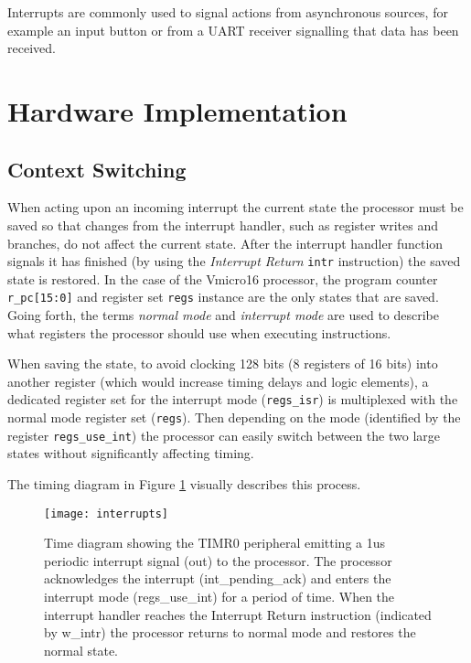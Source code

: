 Interrupts are commonly used to signal actions from asynchronous sources, for example an input button or from a UART receiver signalling that data has been received.

\section{Hardware Implementation}

\subsection{Context Switching}
When acting upon an incoming interrupt the current state the processor must be saved so that changes from the interrupt handler, such as register writes and branches, do not affect the current state. After the interrupt handler function signals it has finished (by using the \textit{Interrupt Return} \verb|intr| instruction) the saved state is restored.
In the case of the Vmicro16 processor, the program counter \verb|r_pc[15:0]| and register set \verb|regs| instance are the only states that are saved. Going forth, the terms \textit{normal mode} and \textit{interrupt mode} are used to describe what registers the processor should use when executing instructions.

When saving the state, to avoid clocking 128 bits (8 registers of 16 bits) into another register (which would increase timing delays and logic elements), a dedicated register set for the interrupt mode (\verb|regs_isr|) is multiplexed with the normal mode register set (\verb|regs|). Then depending on the mode (identified by the register \verb|regs_use_int|) the processor can easily switch between the two large states without significantly affecting timing.

The timing diagram in Figure \ref{fig:interrupts} visually describes this process.

\begin{figure}[h]
\centering
\texttt{[image: interrupts]}
\caption{Time diagram showing the TIMR0 peripheral emitting a 1us periodic interrupt signal (out) to the processor. The processor acknowledges the interrupt (int\_pending\_ack) and enters the interrupt mode (regs\_use\_int) for a period of time. When the interrupt handler reaches the Interrupt Return instruction (indicated by w\_intr) the processor returns to normal mode and restores the normal state.}
\label{fig:interrupts}
\end{figure}

